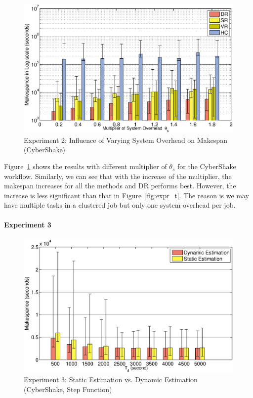 \begin{figure}[!htb]
\centering
  \includegraphics[width=1\linewidth]{figures/tolerance/d.eps}
  \caption{Experiment 2: Influence of Varying System Overhead on Makespan (CyberShake)}
  \label{fig:expr_d}
\end{figure}

Figure~\ref{fig:expr_d} shows the results with different multiplier of $\theta_{s}$ for the CyberShake workflow. Similarly, we can see that with the increase of the multiplier, the makespan increases for all the methods and DR performs best. However, the increase is less significant than that in Figure~\ref{fig:expr_t}. The reason is we may have multiple tasks in a clustered job but only one system overhead per job.


\paragraph{\textbf{Experiment 3}}
\begin{figure}[!htb]
\centering
  \includegraphics[width=1\linewidth]{figures/tolerance/versus.eps}
  \caption{Experiment 3: Static Estimation vs. Dynamic Estimation (CyberShake, Step Function)}
  \label{fig:expr_static_dynamic}
\end{figure}

